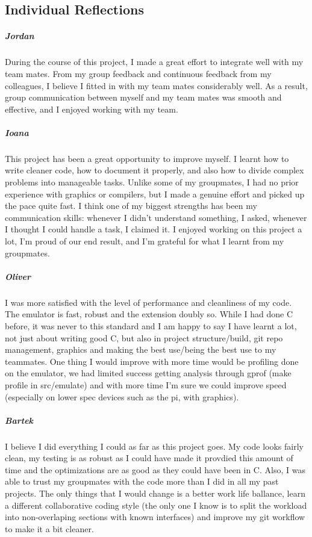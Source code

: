 \documentclass[11pt]{article}
\begin{document}
\subsection*{Individual Reflections}
\subparagraph*{Jordan}
During the course of this project, I made a great effort to integrate well with my team mates. From my group feedback and continuous feedback from my colleagues, I believe I fitted in with my team mates considerably well. As a result, group communication between myself and my team mates was smooth and effective, and I enjoyed working with my team.
\subparagraph*{Ioana}
This project has been a great opportunity to improve myself. I learnt how to write cleaner code, how to document it properly, and also how to divide complex problems into manageable tasks. Unlike some of my groupmates, I had no prior experience with graphics or compilers, but I made a genuine effort and picked up the pace quite fast. I think one of my biggest strengths has been my communication skills: whenever I didn't understand something, I asked, whenever I thought I could handle a task, I claimed it. I enjoyed working on this project a lot, I'm proud of our end result, and I'm grateful for what I learnt from my groupmates.
\subparagraph*{Oliver}
I was more satisfied with the level of performance and cleanliness of my code. The emulator is fast, robust and the extension doubly so. While I had done C before, it was never to this standard and I am happy to say I have learnt a lot, not just about writing good C, but also in project structure/build, git repo management, graphics and making the best use/being the best use to my teammates. One thing I would improve with more time would be profiling done on the emulator, we had limited success getting analysis through gprof (make profile in src/emulate) and with more time I'm sure we could improve speed (especially on lower spec devices such as the pi, with graphics).
\subparagraph*{Bartek}
I believe I did everything I could as far as this project goes. My code looks fairly clean, my testing is as robust as I could have made it provdied this amount of time and the optimizations are as good as they could have been in C. Also, I was able to trust my groupmates with the code more than I did in all my past projects. The only things that I would change is a better work life ballance, learn a different collaborative coding style (the only one I know is to split the workload into non-overlaping sections with known interfaces) and improve my git workflow to make it a bit cleaner.
\end{document}
